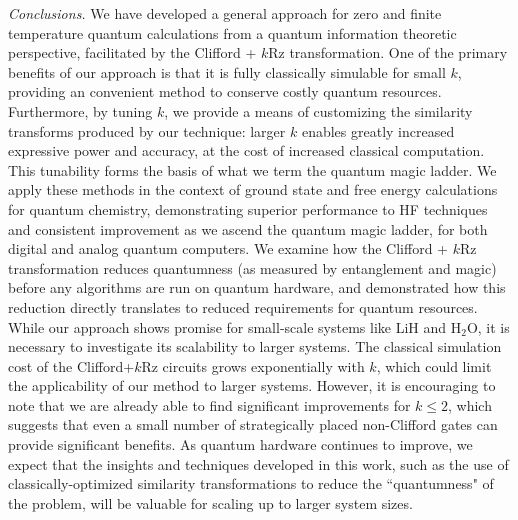 \documentclass[a4paper,accepted=2024-07-10]{quantumarticle}
\begin{document}
\textit{Conclusions.} We have developed a general approach for zero and finite temperature quantum calculations from a quantum information theoretic perspective, facilitated by the Clifford + $k$Rz transformation. One of the primary benefits of our approach is that it is fully classically simulable for small $k$, providing an convenient method to conserve costly quantum resources. Furthermore, by tuning $k$, we provide a means of customizing the similarity transforms produced by our technique: larger $k$ enables greatly increased expressive power and accuracy, at the cost of increased classical computation. This tunability forms the basis of what we term the quantum magic ladder. We apply these methods in the context of ground state and free energy calculations for quantum chemistry, demonstrating superior performance to HF techniques and consistent improvement as we ascend the quantum magic ladder, for both digital and analog quantum computers. We examine how the Clifford + $k$Rz transformation reduces quantumness (as measured by entanglement and magic) before any algorithms are run on quantum hardware, and demonstrated how this reduction directly translates to reduced requirements for quantum resources. While our approach shows promise for small-scale systems like LiH and H$_2$O, it is necessary to investigate its scalability to larger systems. The classical simulation cost of the Clifford+$k$Rz circuits grows exponentially with $k$, which could limit the applicability of our method to larger systems. However, it is encouraging to note that we are already able to find significant improvements for $k \leq 2$, which suggests that even a small number of strategically placed non-Clifford gates can provide significant benefits. As quantum hardware continues to improve, we expect that the insights and techniques developed in this work, such as the use of classically-optimized similarity transformations to reduce the ``quantumness" of the problem, will be valuable for scaling up to larger system sizes.
\end{document}
